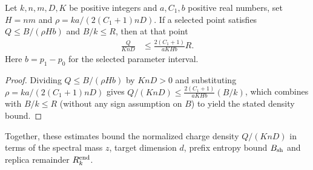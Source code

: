 \begin{lemma}
    \label{thm:arealaw-selected-density-normalization}
    \leanok
    Let $k,n,m,D,K$ be positive integers and $a,C_1,b$ positive real
    numbers, set $H=nm$ and
    $\rho=ka/(2(C_1+1)nD)$. If a selected point satisfies
    $Q\leq B/(\rho H b)$ and $B/k\leq R$, then at that point
    \begin{align}
        \frac{Q}{KnD} & \leq\frac{2(C_1+1)}{aKHb}R.
        \label{eq:arealaw-selected-density-normalization}
    \end{align}
    Here $b=p_1-p_0$ for the selected parameter interval.
\end{lemma}
\begin{proof}
    \leanok
    Dividing $Q\leq B/(\rho H b)$ by $KnD>0$ and substituting
    $\rho=ka/(2(C_1+1)nD)$ gives
    $Q/(KnD)\leq\frac{2(C_1+1)}{aKHb}(B/k)$, which combines with
    $B/k\leq R$ (without any sign assumption on $B$) to yield the stated
    density bound.
\end{proof}

Together, these estimates bound the normalized charge density $Q/(KnD)$
in terms of the spectral mass $z$, target dimension $d$, prefix entropy
bound $B_{\rm sh}$ and replica remainder $R_k^{\rm end}$.
